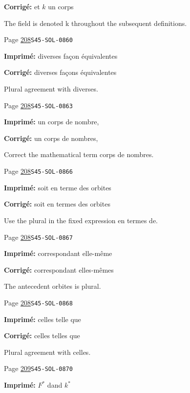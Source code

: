 \begin{description}
\par\noindent\textbf{Corrigé:} et $k$ un corps
\par\noindent The field is denoted k throughout the subsequent definitions.
\smallskip
\item[\hypertarget{apparatus:FR-0205}{205}] Page \hyperlink{printpage:fr:208}{208}\quad\texttt{S45-SOL-0860}
\par\noindent\textbf{Imprimé:} diverses façon équivalentes
\par\noindent\textbf{Corrigé:} diverses façons équivalentes
\par\noindent Plural agreement with diverses.
\smallskip
\item[\hypertarget{apparatus:FR-0206}{206}] Page \hyperlink{printpage:fr:208}{208}\quad\texttt{S45-SOL-0863}
\par\noindent\textbf{Imprimé:} un corps de nombre,
\par\noindent\textbf{Corrigé:} un corps de nombres,
\par\noindent Correct the mathematical term corps de nombres.
\smallskip
\item[\hypertarget{apparatus:FR-0207}{207}] Page \hyperlink{printpage:fr:208}{208}\quad\texttt{S45-SOL-0866}
\par\noindent\textbf{Imprimé:} soit en terme des orbites
\par\noindent\textbf{Corrigé:} soit en termes des orbites
\par\noindent Use the plural in the fixed expression en termes de.
\smallskip
\item[\hypertarget{apparatus:FR-0208}{208}] Page \hyperlink{printpage:fr:208}{208}\quad\texttt{S45-SOL-0867}
\par\noindent\textbf{Imprimé:} correspondant elle-même
\par\noindent\textbf{Corrigé:} correspondant elles-mêmes
\par\noindent The antecedent orbites is plural.
\smallskip
\item[\hypertarget{apparatus:FR-0209}{209}] Page \hyperlink{printpage:fr:208}{208}\quad\texttt{S45-SOL-0868}
\par\noindent\textbf{Imprimé:} celles telle que
\par\noindent\textbf{Corrigé:} celles telles que
\par\noindent Plural agreement with celles.
\smallskip
\item[\hypertarget{apparatus:FR-0210}{210}] Page \hyperlink{printpage:fr:209}{209}\quad\texttt{S45-SOL-0870}
\par\noindent\textbf{Imprimé:} $F^\ast$ dand $k^\ast$

\end{description}
